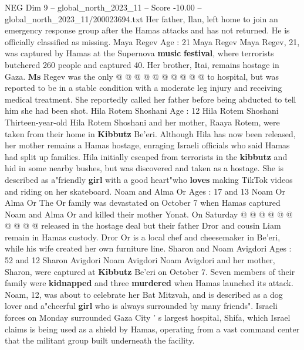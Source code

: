 \begin{textsample}{NEG Dim 9 – global\_north\_2023\_11 – Score -10.00 – global\_north\_2023\_11/200023694.txt}
Her father, Ilan, left home to join an emergency response group after the Hamas attacks and has not returned.
He is officially classified as missing.
Maya Regev Age : 21 Maya Regev Maya Regev, 21, was captured by Hamas at the Supernova \textbf{music} \textbf{festival}, where terrorists butchered 260 people and captured 40.
Her brother, Itai, remains hostage in Gaza. \textbf{Ms} Regev was the only @ @ @ @ @ @ @ @ @ @ to hospital, but was reported to be in a stable condition with a moderate leg injury and receiving medical treatment.
She reportedly called her father before being abducted to tell him she had been shot.
Hila Rotem Shoshani Age : 12 Hila Rotem Shoshani Thirteen-year-old Hila Rotem Shoshani and her mother, Raaya Rotem, were taken from their home in \textbf{Kibbutz} Be'eri.
Although Hila has now been released, her mother remains a Hamas hostage, enraging Israeli officials who said Hamas had split up families.
Hila initially escaped from terrorists in the \textbf{kibbutz} and hid in some nearby bushes, but was discovered and taken as a hostage.
She is described as a"friendly \textbf{girl} with a good heart"who \textbf{loves} making TikTok videos and riding on her skateboard.
Noam and Alma Or Ages : 17 and 13 Noam Or Alma Or The Or family was devastated on October 7 when Hamas captured Noam and Alma Or and killed their mother Yonat.
On Saturday @ @ @ @ @ @ @ @ @ @ released in the hostage deal but their father Dror and cousin Liam remain in Hamas custody.
Dror Or is a local chef and cheesemaker in Be'eri, while his wife created her own furniture line.
Sharon and Noam Avigdori Ages : 52 and 12 Sharon Avigdori Noam Avigdori Noam Avigdori and her mother, Sharon, were captured at \textbf{Kibbutz} Be'eri on October 7.
Seven members of their family were \textbf{kidnapped} and three \textbf{murdered} when Hamas launched its attack.
Noam, 12, was about to celebrate her Bat Mitzvah, and is described as a dog lover and a"cheerful \textbf{girl} who is always surrounded by many friends".
Israeli forces on Monday surrounded Gaza City ' s largest hospital, Shifa, which Israel claims is being used as a shield by Hamas, operating from a vast command center that the militant group built underneath the facility.

\end{textsample}

